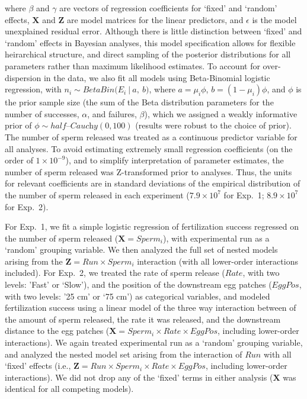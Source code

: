 \documentclass{article}
\begin{document}
	\noindent where $\beta$ and $\gamma$ are vectors of regression coefficients for `fixed' and `random' effects, $\mathbf{X}$ and $\mathbf{Z}$ are model matrices for the linear predictors, and $\epsilon$ is the model unexplained residual error. Although there is little distinction between `fixed' and `random' effects in Bayesian analyses, this model specification allows for flexible heirarchical structure, and direct sampling of the posterior distributions for all parameters rather than maximum likelihood estimates. To account for over-dispersion in the data, we also fit all models using Beta-Binomial logistic regression, with $n_i \sim BetaBin\Big(E_i~|~a,~b\Big)$, where $a = \mu_i \phi$, $b = (1 - \mu_i) \phi$, and $\phi$ is the prior sample size (the sum of the Beta distribution parameters for the number of successes, $\alpha$, and failures, $\beta$), which we assigned a weakly informative prior of $\phi \sim \mathit{half} \text{--} \textit{Cauchy}(0,100)$ (results were robust to the choice of prior). The number of sperm released was treated as a continuous predictor variable for all analyses. To avoid estimating extremely small regression coefficients (on the order of $1 \times 10^{-9}$), and to simplify interpretation of parameter estimates, the number of sperm released was Z-transformed prior to analyses. Thus, the units for relevant coefficients are in standard deviations of the empirical distribution of the number of sperm released in each experiment ($7.9 \times 10^{7}$ for Exp.~1; $8.9 \times 10^{7}$ for Exp.~2). 

	For Exp.~1, we fit a simple logistic regression of fertilization success regressed on the number of sperm released ($\mathbf{X} = Sperm_i$), with experimental run as a `random' grouping variable. We then analyzed the full set of nested models arising from the $\mathbf{Z} = Run \times Sperm_i$ interaction (with all lower-order interactions included). For Exp.~2, we treated the rate of sperm release ($Rate$, with two levels: 'Fast' or `Slow'), and the position of the downstream egg patches ($EggPos$, with two levels: '25 cm' or `75 cm') as categorical variables, and modeled fertilization success using a linear model of the three way interaction between of the amount of sperm released, the rate it was released, and the downstream distance to the egg patches ($ \mathbf{X} = Sperm_i \times Rate \times EggPos$, including lower-order interactions). We again treated experimental run as a `random' grouping variable, and analyzed the nested model set arising from the interaction of $Run$ with all `fixed' effects (i.e., $\mathbf{Z} = Run \times Sperm_i \times Rate \times EggPos$, including lower-order interactions). We did not drop any of the `fixed' terms in either analysis ($\mathbf{X}$ was identical for all competing models).
\end{document}
